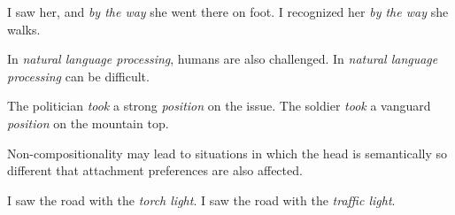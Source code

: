 \documentclass[output=paper]{langsci/langscibook}
\begin{document}

\begin{exe} 
\noindent\parbox{\textwidth}{\ex
  \begin{xlist}
    \ex I saw her, and \textit{by the way} she went there on foot.
    \ex I recognized her \textit{by the way} she walks.
  \end{xlist}}%
  \ex
  \begin{xlist}
    \ex In \textit{natural language processing}, humans are also challenged.
    \ex In \textit{natural language processing} can be difficult.
  \end{xlist}
  \ex
  \begin{xlist}
    \ex The politician \textit{took} a strong \textit{position} on the issue.
    \ex The soldier \textit{took} a vanguard \textit{position} on the mountain top.
  \end{xlist}
\end{exe}

Non-compositionality may lead to situations in which the head is semantically so different that attachment preferences are also affected.

\begin{exe}
  \ex
  \begin{xlist}
    \ex I saw the road with the \textit{torch light}.
    \ex I saw the road with the \textit{traffic light}.
  \end{xlist}
\end{exe}
\end{document}

